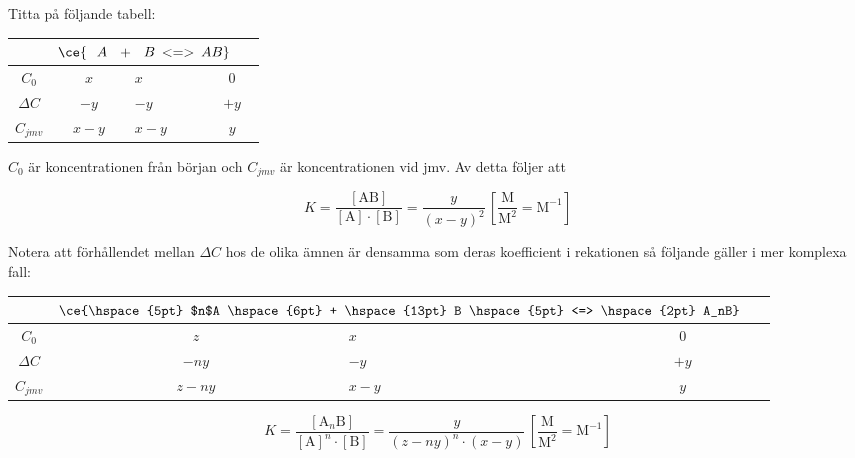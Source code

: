 \begin{exm}
    Titta på följande tabell:
    \begin{table}[H]
        \centering
        \begin{tabular}{|c|c|>{\centering\arraybackslash}m{31.5pt}|c|} 
        \cline{2-4}
        \multicolumn{1}{l|}{} & \multicolumn{3}{c|}{$\ce{\hspace{7pt} A \hspace{7pt} + \hspace{7pt} B \hspace{2pt} <=> \hspace{2pt} AB} \hspace{15pt}$}  \\ 
        \hline
        $C_0$                 & $x$   & $x$   & $0$                       \\ 
        \hline
        $\Delta C$            & $-y$  & $-y$  & $+y$                      \\ 
        \hline
        $C_{jmv}$             & $x-y$ & $x-y$ & $y$                       \\
        \hline
        \end{tabular}
    \end{table}
    
    \noindent $C_0$ är koncentrationen från början och $C_{jmv}$ är koncentrationen vid jmv. Av detta följer att
    
    \begin{equation*}
        K = \frac{[\mathrm{AB}]}{\mathrm{[A] \cdot [B]}} = \frac{y}{(x-y)^2} \, \mathrm{\left[\frac{M}{M^2}=M^{-1}\right]}
    \end{equation*}
    
    \noindent Notera att förhållendet mellan $\Delta C$ hos de olika ämnen är densamma som deras koefficient i rekationen så följande gäller i mer komplexa fall:
    
    \begin{table}[H]
        \centering
        \begin{tabular}{|c|c|>{\centering\arraybackslash}m{40pt}|c|} 
        \cline{2-4}
        \multicolumn{1}{l|}{} & \multicolumn{3}{c|}{$\ce{\hspace{5pt} $n$A \hspace{6pt} + \hspace{13pt} B \hspace{5pt} <=> \hspace{2pt} A_nB} \hspace{15pt}$}  \\ 
        \hline
        $C_0$                 & $z$   & $x$   & $0$                       \\ 
        \hline
        $\Delta C$            & $-ny$  & $-y$  & $+y$                      \\ 
        \hline
        $C_{jmv}$             & $z-ny$ & $x-y$ & $y$                       \\
        \hline
        \end{tabular}
    \end{table}
    
    \begin{equation*}
        K = \frac{[\mathrm{A}_n\mathrm{B}]}{[\mathrm{A}]^n \cdot [\mathrm{B}]} = \frac{y}{(z-ny)^n \cdot (x-y)} \, \mathrm{\left[\frac{M}{M^2}=M^{-1}\right]}
    \end{equation*}
\end{exm}